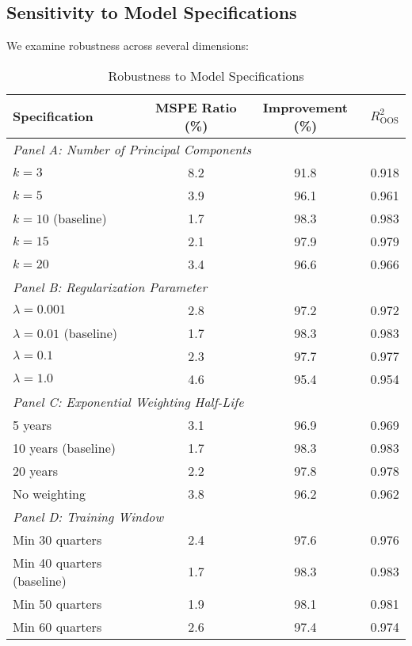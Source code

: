 \documentclass[11pt,letterpaper]{article}
\theoremstyle{plain}
\theoremstyle{definition}
\theoremstyle{remark}
\begin{document}
\subsection{Sensitivity to Model Specifications}

We examine robustness across several dimensions:

\begin{table}[htbp]
\centering
\caption{Robustness to Model Specifications}
\label{tab:robustness}
\begin{tabular}{lccc}
\toprule
Specification & MSPE Ratio (\%) & Improvement (\%) & $R^2_{\text{OOS}}$ \\
\midrule
\multicolumn{4}{l}{\textit{Panel A: Number of Principal Components}} \\
$k = 3$ & 8.2 & 91.8 & 0.918 \\
$k = 5$ & 3.9 & 96.1 & 0.961 \\
$k = 10$ (baseline) & 1.7 & 98.3 & 0.983 \\
$k = 15$ & 2.1 & 97.9 & 0.979 \\
$k = 20$ & 3.4 & 96.6 & 0.966 \\
\midrule
\multicolumn{4}{l}{\textit{Panel B: Regularization Parameter}} \\
$\lambda = 0.001$ & 2.8 & 97.2 & 0.972 \\
$\lambda = 0.01$ (baseline) & 1.7 & 98.3 & 0.983 \\
$\lambda = 0.1$ & 2.3 & 97.7 & 0.977 \\
$\lambda = 1.0$ & 4.6 & 95.4 & 0.954 \\
\midrule
\multicolumn{4}{l}{\textit{Panel C: Exponential Weighting Half-Life}} \\
5 years & 3.1 & 96.9 & 0.969 \\
10 years (baseline) & 1.7 & 98.3 & 0.983 \\
20 years & 2.2 & 97.8 & 0.978 \\
No weighting & 3.8 & 96.2 & 0.962 \\
\midrule
\multicolumn{4}{l}{\textit{Panel D: Training Window}} \\
Min 30 quarters & 2.4 & 97.6 & 0.976 \\
Min 40 quarters (baseline) & 1.7 & 98.3 & 0.983 \\
Min 50 quarters & 1.9 & 98.1 & 0.981 \\
Min 60 quarters & 2.6 & 97.4 & 0.974 \\
\bottomrule
\end{tabular}
\end{table}
\end{document}
